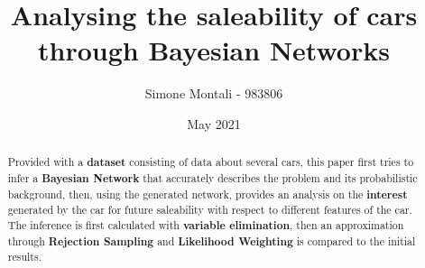 \documentclass[10pt,a4paper]{article}
\begin{document}
\title{Analysing the saleability of cars through Bayesian Networks} %
\author{Simone Montali - 983806}
\date{May 2021} %
\maketitle %




\begin{abstract}
\normalsize
Provided with a \textbf{dataset} consisting of data about several cars, this paper first tries to infer a \textbf{Bayesian Network} that accurately describes the problem and its probabilistic background, then, using the generated network, provides an analysis on the \textbf{interest} generated by the car for future saleability with respect to different features of the car. The inference is first calculated with \textbf{variable elimination}, then an approximation through \textbf{Rejection Sampling} and \textbf{Likelihood Weighting} is compared to the initial results.

\end{abstract}

\setcounter{tocdepth}{2}
\tableofcontents


\clearpage








\clearpage



\clearpage
{}

\end{document}
